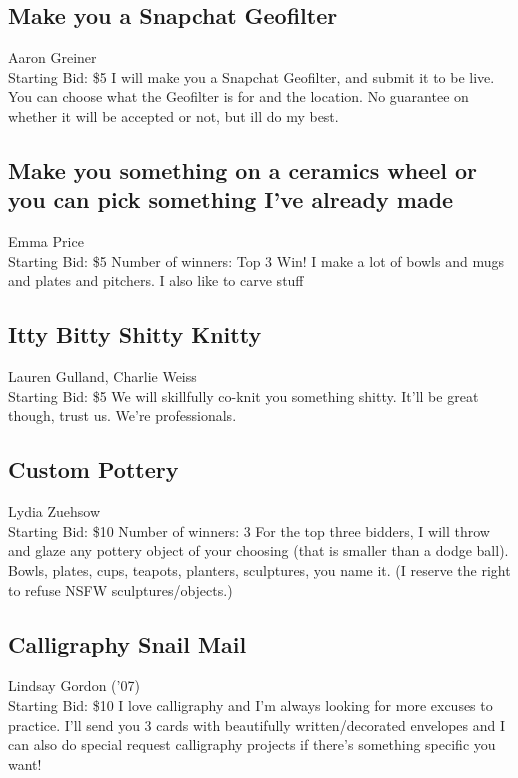 \documentclass[11pt]{article}
\begin{document}
\subsection{Make you a Snapchat Geofilter}
Aaron Greiner
\\
Starting Bid: \$5
\newline
I will make you a Snapchat Geofilter, and submit it to be live. You can choose what the Geofilter is for and the location. No guarantee on whether it will be accepted or not, but ill do my best.
\subsection{Make you something on a ceramics wheel or you can pick something I've already made}
Emma Price
\\
Starting Bid: \$5
\newline
Number of winners: Top 3 Win!
\newline
I make a lot of bowls and mugs and plates and pitchers. I also like to carve stuff
\subsection{Itty Bitty Shitty Knitty}
Lauren Gulland, Charlie Weiss
\\
Starting Bid: \$5
\newline
We will skillfully co-knit you something shitty. It'll be great though, trust us. We're professionals.
\subsection{Custom Pottery}
Lydia Zuehsow
\\
Starting Bid: \$10
\newline
Number of winners: 3
\newline
For the top three bidders, I will throw and glaze any pottery object of your choosing (that is smaller than a dodge ball). Bowls, plates, cups, teapots, planters, sculptures, you name it.
(I reserve the right to refuse NSFW sculptures/objects.)
\subsection{Calligraphy Snail Mail}
Lindsay Gordon ('07)
\\
Starting Bid: \$10
\newline
I love calligraphy and I'm always looking for more excuses to practice. I’ll send you 3 cards with beautifully written/decorated envelopes and I can also do special request calligraphy projects if there's something specific you want!
\end{document}
